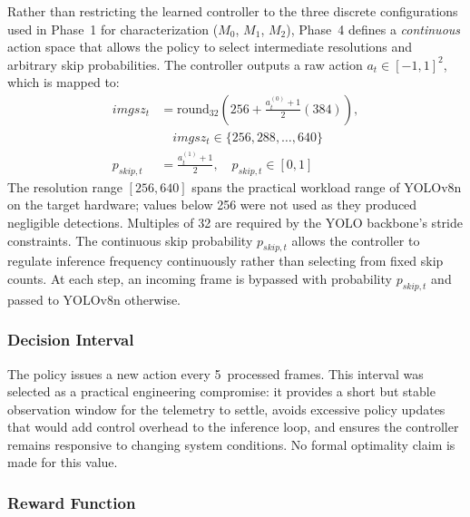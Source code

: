 \documentclass{ieeeaccess}
\begin{document}
Rather than restricting the learned controller to the three discrete
configurations used in Phase~1 for characterization ($M_0$, $M_1$, $M_2$),
Phase~4 defines a \emph{continuous} action space that allows the policy to
select intermediate resolutions and arbitrary skip probabilities. The
controller outputs a raw action $a_t \in [-1,1]^2$, which is mapped to:
\begin{align}
imgsz_t &= \mathrm{round}_{32}\!\left(256 + \tfrac{a_t^{(0)}+1}{2}(384)\right), \nonumber\\
&\quad imgsz_t \in \{256, 288, \ldots, 640\} \\
p_{skip,t} &= \tfrac{a_t^{(1)}+1}{2},\quad p_{skip,t} \in [0,1]
\end{align}
The resolution range $[256, 640]$ spans the practical workload range of
YOLOv8n on the target hardware; values below 256 were not used as they
produced negligible detections. Multiples of 32 are required by the YOLO
backbone's stride constraints. The continuous skip probability $p_{skip,t}$
allows the controller to regulate inference frequency continuously rather
than selecting from fixed skip counts. At each step, an incoming frame is
bypassed with probability $p_{skip,t}$ and passed to YOLOv8n otherwise.

\subsubsection*{Decision Interval}

The policy issues a new action every 5~processed frames. This interval was
selected as a practical engineering compromise: it provides a short but
stable observation window for the telemetry to settle, avoids excessive
policy updates that would add control overhead to the inference loop, and
ensures the controller remains responsive to changing system conditions.
No formal optimality claim is made for this value.

\subsubsection*{Reward Function}
\end{document}
